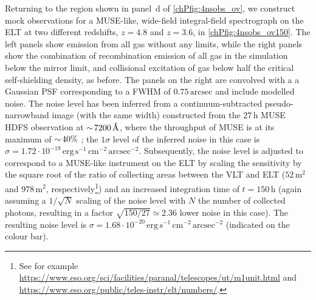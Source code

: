 Returning to the region shown in panel~d of \cref{chPfig:4nsobs_ov}, we construct mock observations for a MUSE-like, wide-field integral-field spectrograph on the ELT at two different redshifts, $z=4.8$ and $z=3.6$, in \cref{chPfig:4nsobs_ov150}. The left panels show emission from all gas without any limits, while the right panels show the combination of recombination emission of all gas in the simulation below the mirror limit, and collisional excitation of gas below half the critical self-shielding density, as before. The panels on the right are convolved with a a Gaussian PSF corresponding to a FWHM of $0.75 \, \mathrm{arcsec}$ \citep[as in the HDFS observation, see][]{2015A&A...575A..75B} and include modelled noise. The noise level has been inferred from a continuum-subtracted pseudo-narrowband image (with the same width) constructed from the $27 \, \mathrm{h}$ MUSE HDFS observation \citep{2015A&A...575A..75B} at $\sim \! 7200 \, \text{\AA}$, where the throughput of MUSE is at its maximum of $\sim \! 40\%$ \citep[e.g.][; but see also \cref{chPfig:MUSE_sigmas}]{2019arXiv190601657R}; the $1 \sigma$ level of the inferred noise in this case is $\sigma = 1.72 \cdot 10^{-19} \, \mathrm{erg \, s^{-1} \, cm^{-2} \, arcsec^{-2}}$. Subsequently, the noise level is adjusted to correspond to a MUSE-like instrument on the ELT by scaling the sensitivity by the square root of the ratio of collecting areas between the VLT and ELT ($52 \, \mathrm{m^2}$ and $978 \, \mathrm{m^2}$, respectively\footnote{See for example \url{https://www.eso.org/sci/facilities/paranal/telescopes/ut/m1unit.html} and \url{https://www.eso.org/public/teles-instr/elt/numbers/}.}) and an increased integration time of $t=150 \, \mathrm{h}$ (again assuming a $1/\sqrt{N}$ scaling of the noise level with $N$ the number of collected photons, resulting in a factor $\sqrt{150/27} \simeq 2.36$ lower noise in this case). The resulting noise level is $\sigma = 1.68 \cdot 10^{-20} \, \mathrm{erg \, s^{-1} \, cm^{-2} \, arcsec^{-2}}$ (indicated on the colour bar).

